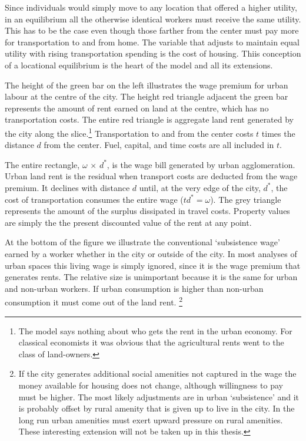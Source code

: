  Since individuals would simply move to any location that offered a higher utility, in an equilibrium all the otherwise identical workers must receive the same utility. This has to be the case even though those farther from the center must pay more for transportation to and from home. The variable that  adjusts to maintain equal utility with rising transportation spending is the cost of housing. Thiis conception of a locational equilibrium is the heart of the model and all its extensions.

The height of the green bar on the left illustrates the wage premium for urban labour at the centre of the  city. 
The height red triangle adjacent the green bar represents the amount of rent earned on land at the centre, which has no transportation costs. The entire red triangle is aggregate land rent generated by the city along the slice.\footnote{The model says nothing about who gets the rent in the urban economy. For classical economists it was obvious that the agricultural rents went to the class of land-owners.} Transportation to and from the center costs $t$ times the distance $d$ from the center. Fuel, capital, and time costs are  all included in $t$. 

\begin{figure}
    \begin{center}
    
    \caption{}
    \label{fig:city_simple_alonzo}
    \end{center}
\end{figure}

The entire rectangle, $\omega$ $\times$ $d^*$, is the wage bill generated by urban agglomeration. Urban land rent is the residual when transport costs are deducted from the wage premium. It declines  with distance $d$ until, at the very edge of the city, $d^*$, the cost of transportation  consumes the entire wage ($td^*=\omega$). The grey triangle represents the amount of the surplus dissipated in travel costs.  Property values are simply the the present discounted value of the rent at any point.

At the bottom of the figure we illustrate the conventional `subsistence wage'  earned by a worker whether in the city or outside of the city.   In most analyses of urban spaces this living wage is simply ignored, since it is the wage premium that generates rents.  The relative size is unimportant because it is the same for urban and non-urban workers. If urban consumption is higher than non-urban consumption it must come out of the land rent.
\footnote{If the city generates additional social amenities not captured in the wage  the money available for housing does not change, although willingness to pay must be higher.  The  most likely adjustments are in urban `subsistence' and it is probably offset by rural amenity that is given up to live in the city. In the long run urban amenities must exert upward pressure on rural amenities. These interesting extension will not be taken up in this thesis. }

